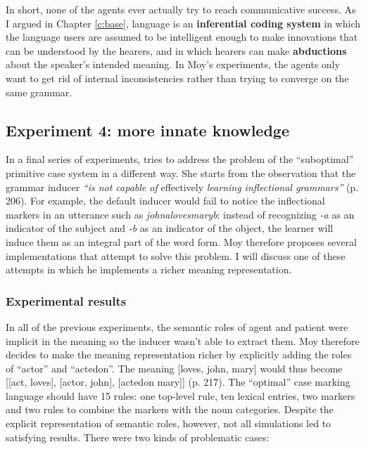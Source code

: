 In short, none of the agents ever actually try to reach communicative success. As I argued in Chapter \ref{c:base}, language is an {\bfseries inferential coding system} in which the language users are assumed to be intelligent enough to make innovations that can be understood by the hearers, and in which hearers can make {\bfseries abductions} about the speaker's intended meaning. In Moy's experiments, the agents only want to get rid of internal inconsistencies rather than trying to converge on the same grammar.

\subsection{Experiment 4: more innate knowledge}

In a final series of experiments, \citet[chapter 7]{moy06case} tries to address the problem of the ``suboptimal'' primitive case system in a different way. She starts from the observation that the grammar inducer {\em ``is not capable of} effectively {\em learning inflectional grammars''} (p. 206). For example, the default inducer would fail to notice the inflectional markers in an utterance such as {\em johnalovesmaryb}: instead of recognizing {\em -a} as an indicator of the subject and {\em -b} as an indicator of the object, the learner will induce them as an integral part of the word form. Moy therefore proposes several implementations that attempt to solve this problem. I will discuss one of these attempts in which he implements a richer meaning representation.


\subsubsection{Experimental results}
In all of the previous experiments, the semantic roles of agent and patient were implicit in the meaning so the inducer wasn't able to extract them. Moy therefore decides to make the meaning representation richer by explicitly adding the roles of ``actor'' and ``actedon''. The meaning [loves, john, mary] would thus become [[act, loves], [actor, john], [actedon mary]] (p. 217). The ``optimal'' case marking language should have 15 rules: one top-level rule, ten lexical entries, two markers and two rules to combine the markers with the noun categories. Despite the explicit representation of semantic roles, however, not all simulations led to satisfying results. There were two kinds of problematic cases:

